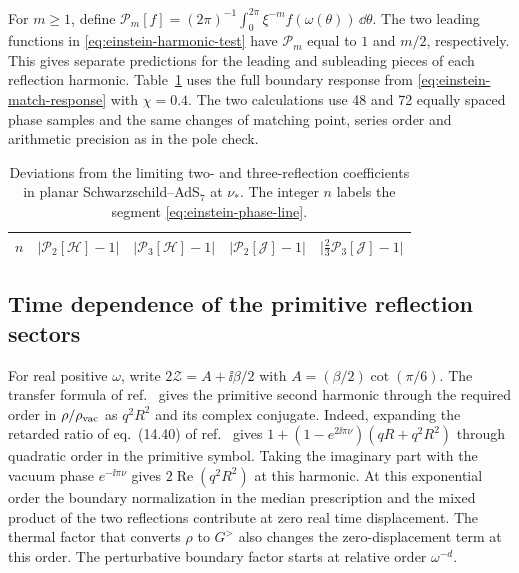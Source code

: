 For \(m\geq1\), define
\(\mathcal P_m[f]=(2\pi)^{-1}\int_0^{2\pi}
\xi^{-m} f(\omega(\theta))\,\dd\theta\).
The two leading functions in \eqref{eq:einstein-harmonic-test} have
\(\mathcal P_m\) equal to \(1\) and \(m/2\), respectively. This gives
separate predictions for the leading and subleading pieces of each
reflection harmonic. Table~\ref{tab:einstein-harmonics} uses the full
boundary response from \eqref{eq:einstein-match-response} with
\(\chi=0.4\). The two calculations use 48 and 72 equally spaced phase
samples and the same changes of matching point, series order and
arithmetic precision as in the pole check.

\begin{table}[t]
 \centering\small
 \begin{tabular}{ccccc}
 \hline
 \(n\) & \(\lvert \mathcal P_2[\mathcal H]-1\rvert\)
       & \(\lvert \mathcal P_3[\mathcal H]-1\rvert\)
       & \(\lvert \mathcal P_2[\mathcal J]-1\rvert\)
       & \(\lvert \tfrac23\mathcal P_3[\mathcal J]-1\rvert\) \\
 \hline
 
 \end{tabular}
 \caption{Deviations from the limiting two- and three-reflection
 coefficients in planar Schwarzschild--AdS\(_7\) at \(\nu_*\).
 The integer \(n\) labels the segment \eqref{eq:einstein-phase-line}.}
 \label{tab:einstein-harmonics}
\end{table}

\subsection{Time dependence of the primitive reflection sectors}

For real positive \(\omega\), write \(2\mathcal Z=A+\ii\beta/2\)
with \(A=(\beta/2)\cot(\pi/6)\). The transfer formula of
ref.~\cite{Jia:2026} gives the primitive second harmonic
through the required order in \(\rho/\rho_{\rm vac}\) as
\(q^2 R^2\) and its complex conjugate. Indeed, expanding the
retarded ratio of eq.~(14.40) of ref.~\cite{Jia:2026} gives
\(1+(1-e^{2\ii\pi\nu})(qR+q^2R^2)\) through quadratic
order in the primitive symbol. Taking the imaginary part with the
vacuum phase \(e^{-\ii\pi\nu}\) gives \(2\operatorname{Re}(q^2R^2)\)
at this harmonic. At this exponential order the boundary
normalization in the median prescription and the mixed product
of the two reflections contribute at zero real time displacement.
The thermal factor that converts \(\rho\) to \(G^>\) also changes
the zero-displacement term at this order. The perturbative
boundary factor starts at relative order \(\omega^{-d}\).

